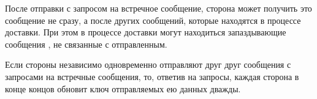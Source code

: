 \begin{note}
После отправки  с запросом на встречное сообщение, сторона 
может получить это сообщение не сразу, а после других сообщений, которые 
находятся в процессе доставки. При этом в процессе доставки могут находиться 
запаздывающие сообщения , не связанные с отправленным.
\end{note}


\begin{note}
Если стороны независимо одновременно отправляют друг друг сообщения 
 с запросами на встречные сообщения, то, ответив на запросы, 
каждая сторона в конце концов обновит ключ отправляемых ею данных дважды.
\end{note}


